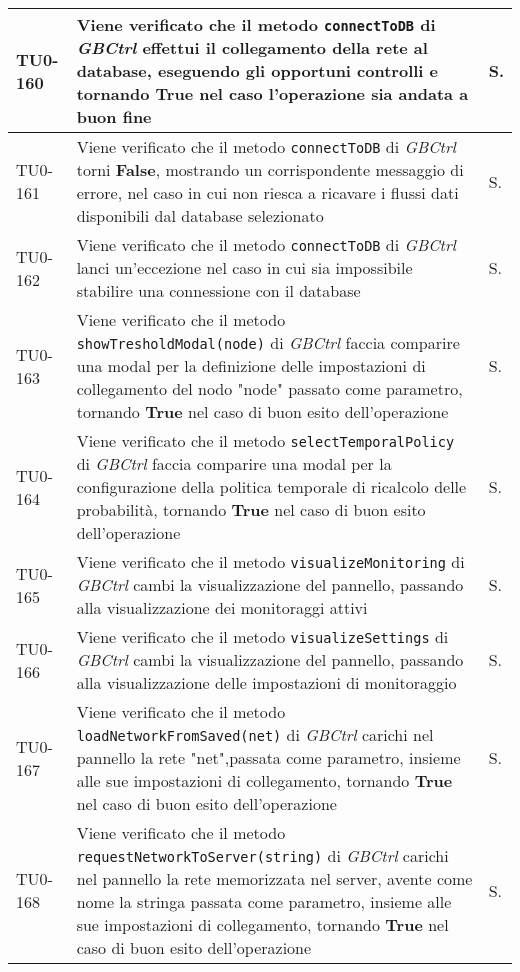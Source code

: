\begin{longtable}{|C{.15\textwidth}|m{.66\textwidth}|C{.10\textwidth}|}
\hline
TU0-160 & Viene verificato che il metodo \texttt{connectToDB} di \textit{GBCtrl} effettui il collegamento della rete al database, eseguendo gli opportuni controlli e tornando \textbf{True} nel caso l'operazione sia andata a buon fine & S.\\
\hline
{}TU0-161 & Viene verificato che il metodo \texttt{connectToDB} di \textit{GBCtrl} torni \textbf{False}, mostrando un corrispondente messaggio di errore, nel caso in cui non riesca a ricavare i flussi dati disponibili dal database selezionato & S.\\
\hline
TU0-162 & Viene verificato che il metodo \texttt{connectToDB} di \textit{GBCtrl} lanci un'eccezione nel caso in cui sia impossibile stabilire una connessione con il database & S.\\
\hline
{}TU0-163 & Viene verificato che il metodo \texttt{showTresholdModal(node)} di \textit{GBCtrl} faccia comparire una modal per la definizione delle impostazioni di collegamento del nodo "node" passato come parametro, tornando \textbf{True} nel caso di buon esito dell'operazione & S.\\
\hline
TU0-164 & Viene verificato che il metodo \texttt{selectTemporalPolicy} di \textit{GBCtrl} faccia comparire una modal per la configurazione della politica temporale di ricalcolo delle probabilità, tornando \textbf{True} nel caso di buon esito dell'operazione & S.\\
\hline
{}TU0-165 & Viene verificato che il metodo \texttt{visualizeMonitoring} di \textit{GBCtrl} cambi la visualizzazione del pannello, passando alla visualizzazione dei monitoraggi attivi & S.\\
\hline
TU0-166 & Viene verificato che il metodo \texttt{visualizeSettings} di \textit{GBCtrl} cambi la visualizzazione del pannello, passando alla visualizzazione delle impostazioni di monitoraggio & S.\\
\hline
{}TU0-167 & Viene verificato che il metodo \texttt{loadNetworkFromSaved(net)} di \textit{GBCtrl} carichi nel pannello la rete "net",passata come parametro, insieme alle sue impostazioni di collegamento, tornando \textbf{True} nel caso di buon esito dell'operazione & S.\\
\hline
TU0-168 & Viene verificato che il metodo \texttt{requestNetworkToServer(string)} di \textit{GBCtrl} carichi nel pannello la rete memorizzata nel server, avente come nome la stringa passata come parametro, insieme alle sue impostazioni di collegamento, tornando \textbf{True} nel caso di buon esito dell'operazione & S.\\

\end{longtable}
